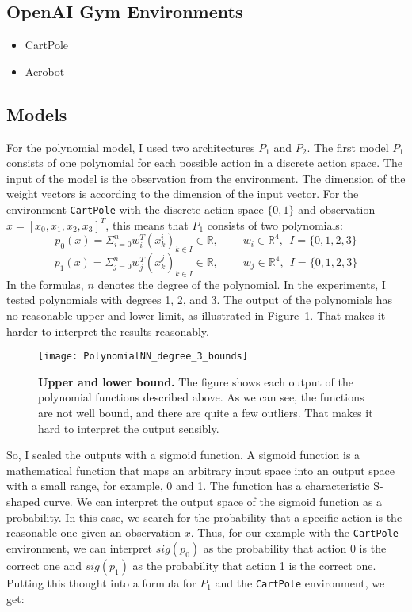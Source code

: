 \subsection{OpenAI Gym Environments}
\begin{itemize}
  \item CartPole
  \item Acrobot
\end{itemize}


\subsection{Models}
\label{ssec:models}
For the polynomial model, I used two architectures $P_1$ and $P_2$. The first model $P_1$ consists of one polynomial for each possible action in a discrete action space. The input of the model is the observation from the environment. The dimension of the weight vectors is according to the dimension of the input vector. For the environment \verb|CartPole| with the discrete action space $\{0, 1\}$ and observation $x = [x_0, x_1, x_2, x_3]^T$, this means that $P_1$ consists of two polynomials:
\[
  p_0(x) = \Sigma_{i=0}^{n} w_i^T (x_k^i)_{k \in I} \in \mathbb{R}, \ \ \ \ \ \ \ \ \ \ w_i \in \mathbb{R}^4, \ \ I = \{0, 1, 2, 3\}
\]
\[
  p_1(x) = \Sigma_{j=0}^{n} w_j^T (x_k^j)_{k \in I} \in \mathbb{R}, \ \ \ \ \ \ \ \ \ \ w_j \in \mathbb{R}^4, \ \ I = \{0, 1, 2, 3\}
\]
In the formulas, $n$ denotes the degree of the polynomial. In the experiments, I tested polynomials with degrees 1, 2, and 3. The output of the polynomials has no reasonable upper and lower limit, as illustrated in Figure~\ref{fig:bounds}. That makes it harder to interpret the results reasonably.
\begin{figure}[ht]
\centering
\texttt{[image: PolynomialNN\_degree\_3\_bounds]}
\caption[Upper and lower bound]{
  \textbf{Upper and lower bound.}
  The figure shows each output of the polynomial functions described above. As we can see, the functions are not well bound, and there are quite a few outliers. That makes it hard to interpret the output sensibly.
}
\label{fig:bounds}
\end{figure}
So, I scaled the outputs with a sigmoid function. A sigmoid function is a mathematical function that maps an arbitrary input space into an output space with a small range, for example, 0 and 1. The function has a characteristic S-shaped curve. We can interpret the output space of the sigmoid function as a probability. In this case, we search for the probability that a specific action is the reasonable one given an observation $x$. Thus, for our example with the \verb|CartPole| environment, we can interpret $sig(p_0)$ as the probability that action 0 is the correct one and $sig(p_1)$ as the probability that action 1 is the correct one. Putting this thought into a formula for $P_1$ and the \verb|CartPole| environment, we get:
